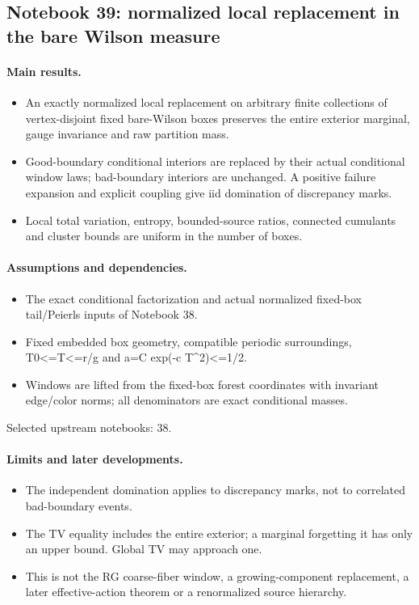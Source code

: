 \subsection{Notebook 39: normalized local replacement in the bare Wilson measure}
\label{hnc-39}
\noindent{}\par

\paragraph{Main results.}
\begin{itemize}
\item An exactly normalized local replacement on arbitrary finite collections of vertex-disjoint fixed bare-Wilson boxes preserves the entire exterior marginal, gauge invariance and raw partition mass.
\item Good-boundary conditional interiors are replaced by their actual conditional window laws; bad-boundary interiors are unchanged. A positive failure expansion and explicit coupling give iid domination of discrepancy marks.
\item Local total variation, entropy, bounded-source ratios, connected cumulants and cluster bounds are uniform in the number of boxes.
\end{itemize}

\paragraph{Assumptions and dependencies.}
\begin{itemize}
\item The exact conditional factorization and actual normalized fixed-box tail/Peierls inputs of Notebook 38.
\item Fixed embedded box geometry, compatible periodic surroundings, T0<=T<=r/g and a=C exp(-c T\textasciicircum{}2)<=1/2.
\item Windows are lifted from the fixed-box forest coordinates with invariant edge/color norms; all denominators are exact conditional masses.
\end{itemize}

Selected upstream notebooks: 38.\par

\paragraph{Limits and later developments.}
\begin{itemize}
\item The independent domination applies to discrepancy marks, not to correlated bad-boundary events.
\item The TV equality includes the entire exterior; a marginal forgetting it has only an upper bound. Global TV may approach one.
\item This is not the RG coarse-fiber window, a growing-component replacement, a later effective-action theorem or a renormalized source hierarchy.
\end{itemize}

